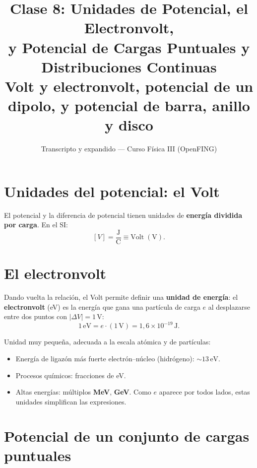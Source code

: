 \documentclass[12pt,a4paper]{article}
\title{\textbf{Clase 8: Unidades de Potencial, el Electronvolt, \\
        y Potencial de Cargas Puntuales y Distribuciones Continuas}\\[0.3em]
        \large{Volt y electronvolt, potencial de un dipolo,
              y potencial de barra, anillo y disco}}
\author{Transcripto y expandido --- Curso Física III (OpenFING)}
\date{}
\begin{document}
\maketitle
\thispagestyle{empty}
\newpage

\tableofcontents
\newpage

\section{Unidades del potencial: el Volt}

El potencial y la diferencia de potencial tienen unidades de
\textbf{energía dividida por carga}. En el SI:
\[
[V] = \frac{\text{J}}{\text{C}} \equiv \text{Volt} \;(\text{V}).
\]

\section{El electronvolt}

Dando vuelta la relación, el Volt permite definir una \textbf{unidad de
energía}: el \textbf{electronvolt} (eV) es la energía que gana una
partícula de carga $e$ al desplazarse entre dos puntos con
$|\Delta V| = 1\,\text{V}$:
\[
1\,\text{eV} = e \cdot (1\,\text{V}) = 1{,}6\times10^{-19}\,\text{J}.
\]

\begin{notebox}
  Unidad muy pequeña, adecuada a la escala atómica y de partículas:
  \begin{itemize}[nosep]
    \item Energía de ligazón más fuerte electrón--núcleo (hidrógeno):
          $\sim 13\,\text{eV}$.
    \item Procesos químicos: fracciones de eV.
    \item Altas energías: múltiplos \textbf{MeV}, \textbf{GeV}. Como $e$
          aparece por todos lados, estas unidades simplifican las
          expresiones.
  \end{itemize}
\end{notebox}

\section{Potencial de un conjunto de cargas puntuales}
\end{document}
